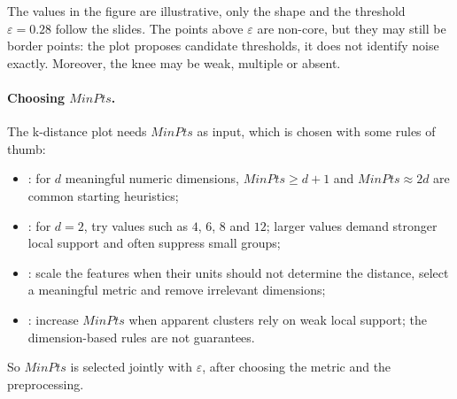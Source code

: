 \begin{center}
\end{center}

\begin{remark}
The values in the figure are illustrative, only the shape and the threshold $\varepsilon = 0.28$ follow the slides. The points above $\varepsilon$ are non-core, but they may still be border points: the plot proposes candidate thresholds, it does not identify noise exactly. Moreover, the knee may be weak, multiple or absent.
\end{remark}

\paragraph{Choosing $MinPts$.} The k-distance plot needs $MinPts$ as input, which is chosen with some rules of thumb:
\begin{itemize}
  \item {}: for $d$ meaningful numeric dimensions, $MinPts \ge d + 1$ and $MinPts \approx 2d$ are common starting heuristics;
  \item {}: for $d = 2$, try values such as $4$, $6$, $8$ and $12$; larger values demand stronger local support and often suppress small groups;
  \item {}: scale the features when their units should not determine the distance, select a meaningful metric and remove irrelevant dimensions;
  \item {}: increase $MinPts$ when apparent clusters rely on weak local support; the dimension-based rules are not guarantees.
\end{itemize}
So $MinPts$ is selected jointly with $\varepsilon$, after choosing the metric and the preprocessing.
